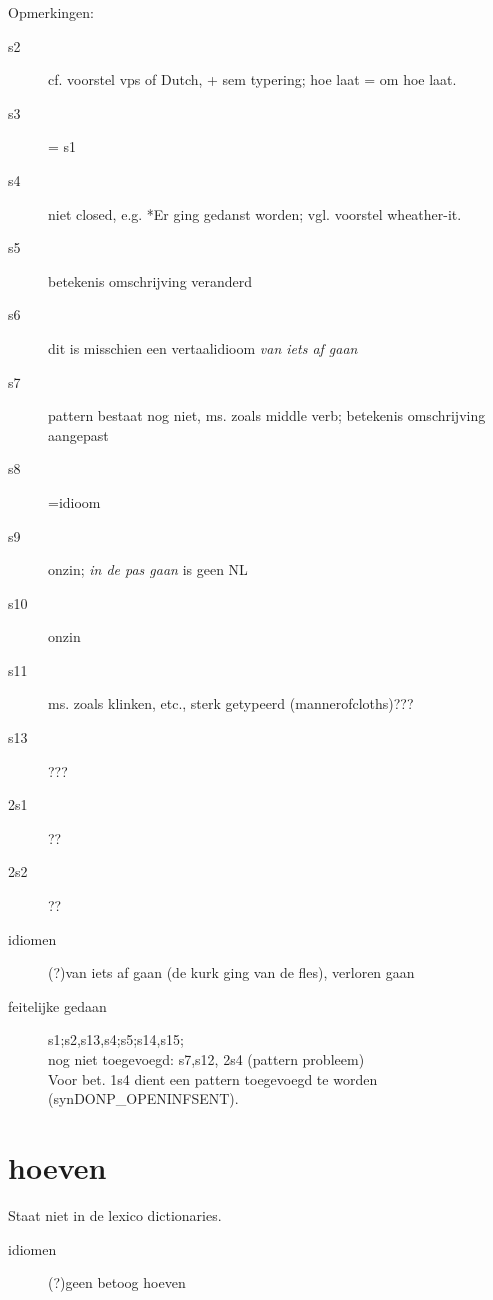 Opmerkingen:

\begin{description}
  \item[s2] cf. voorstel vps of Dutch, + sem typering; hoe laat = om hoe laat.
  \item[s3] = s1
  \item[s4] niet closed, e.g. *Er ging gedanst worden; vgl. voorstel wheather-it.
  \item[s5] betekenis omschrijving veranderd
  \item[s6] dit is misschien een vertaalidioom {\em van iets af gaan}
  \item[s7] pattern bestaat nog niet, ms. zoals middle verb; betekenis omschrijving aangepast
  \item[s8]=idioom
  \item[s9] onzin; {\em in de pas gaan} is geen NL
  \item[s10] onzin
  \item[s11] ms. zoals klinken, etc., sterk getypeerd (mannerofcloths)???
  \item[s13] ???
  \item[2s1]??
  \item[2s2]??
\end{description}

\begin{description}
  \item[idiomen] (?)van iets af gaan (de kurk ging van de fles), verloren gaan
\end{description}


\begin{description}
\item[feitelijke gedaan] s1;s2,s13,s4;s5;s14,s15;\\
              nog niet toegevoegd:  s7,s12, 2s4 (pattern probleem)\\
Voor bet. 1s4 dient een pattern toegevoegd te worden (synDONP\_OPENINFSENT).
\end{description}


\newpage
\section{hoeven}

Staat niet in de lexico dictionaries.

\begin{description}
\item[idiomen] (?)geen betoog hoeven
\end{description}






